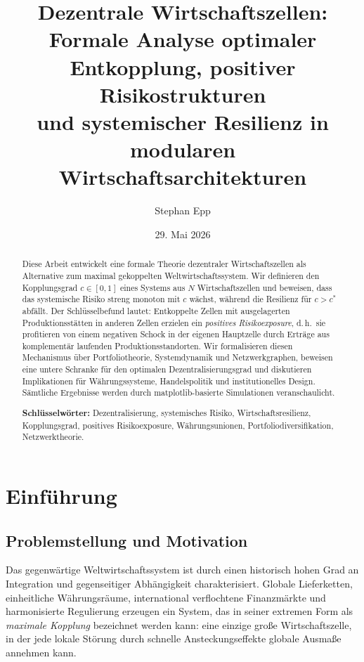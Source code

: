 ﻿\documentclass[a4paper,12pt]{article}
\title{\textbf{Dezentrale Wirtschaftszellen:}\\
\large Formale Analyse optimaler Entkopplung, positiver Risikostrukturen\\
und systemischer Resilienz in modularen Wirtschaftsarchitekturen}
\author{Stephan Epp}
\date{29. Mai 2026}
\theoremstyle{definition}
\begin{document}
\maketitle

\begin{abstract}
Diese Arbeit entwickelt eine formale Theorie dezentraler Wirtschaftszellen als Alternative zum
maximal gekoppelten Weltwirtschaftssystem. Wir definieren den Kopplungsgrad $c \in [0,1]$ eines
Systems aus $N$ Wirtschaftszellen und beweisen, dass das systemische Risiko streng monoton mit $c$
wächst, während die Resilienz für $c > c^*$ abfällt. Der Schlüsselbefund lautet: Entkoppelte Zellen
mit ausgelagerten Produktionsstätten in anderen Zellen erzielen ein \emph{positives Risikoexposure},
d.\,h.\ sie profitieren von einem negativen Schock in der eigenen Hauptzelle durch Erträge aus
komplementär laufenden Produktionsstandorten. Wir formalisieren diesen Mechanismus über
Portfoliotheorie, Systemdynamik und Netzwerkgraphen, beweisen eine untere Schranke für den
optimalen Dezentralisierungsgrad und diskutieren Implikationen für Währungssysteme, Handelspolitik
und institutionelles Design. Sämtliche Ergebnisse werden durch matplotlib-basierte Simulationen
veranschaulicht.

\medskip
\noindent\textbf{Schlüsselwörter:} Dezentralisierung, systemisches Risiko, Wirtschaftsresilienz,
Kopplungsgrad, positives Risikoexposure, Währungsunionen, Portfoliodiversifikation, Netzwerktheorie.
\end{abstract}

\tableofcontents
\newpage

\section{Einführung}

\subsection{Problemstellung und Motivation}

Das gegenwärtige Weltwirtschaftssystem ist durch einen historisch hohen Grad an Integration und
gegenseitiger Abhängigkeit charakterisiert. Globale Lieferketten, einheitliche Währungsräume,
international verflochtene Finanzmärkte und harmonisierte Regulierung erzeugen ein System, das in
seiner extremen Form als \emph{maximale Kopplung} bezeichnet werden kann: eine einzige große
Wirtschaftszelle, in der jede lokale Störung durch schnelle Ansteckungseffekte globale Ausmaße
annehmen kann.
\end{document}
